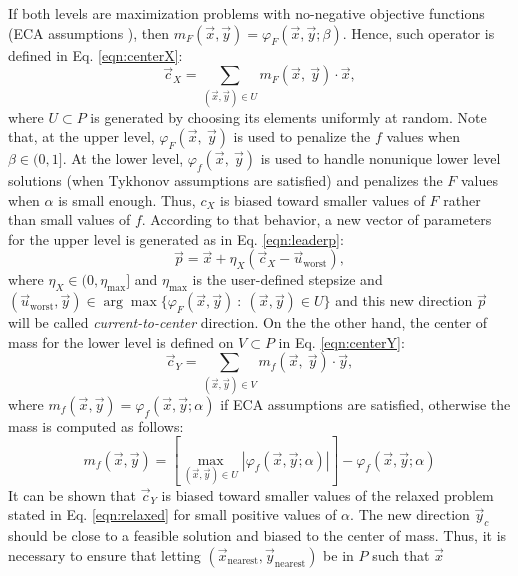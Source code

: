 \documentclass[conference]{IEEEtran}
\theoremstyle{definition}
\begin{document}
If both levels are maximization problems with no-negative objective functions
(ECA assumptions \cite{Mejia2018}), then $m_F(\vec{x}, \vec{y}) = \varphi_F (\vec{x}, \vec{y}; \beta)$.
Hence, such operator is defined in Eq. \ref{eqn:centerX}:
% 
\begin{equation}
    \vec{c}_X = \sum_{(\vec{x}, \vec{y})\in U} m_F(\vec{x},\ \vec{y}) \cdot \vec{x},
    \label{eqn:centerX}
\end{equation}
% 
where $U \subset P$ is generated by choosing its elements uniformly at random.
Note that, at the upper level, $\varphi_F (\vec{x},\ \vec{y})$ is used to penalize
the $f$ values when $\beta\in (0, 1]$. At the lower level, $\varphi_f (\vec{x},\ \vec{y})$
is used to handle nonunique lower level solutions (when Tykhonov assumptions are 
satisfied) and penalizes the $F$ values when $\alpha$ is small enough. Thus, $c_X$
is biased toward smaller values of $F$ rather than small values of $f$. According
to that behavior, a new vector of parameters for the upper level is generated as
in Eq. \ref{eqn:leaderp}:
% 
\begin{equation}
    \vec{p} = \vec{x} + \eta_{X} (\vec{c}_X - \vec{u}_{\text{worst}}),
    \label{eqn:leaderp}
\end{equation}
% 
where $\eta_{X} \in (0, \eta_{\max}]$ and $\eta_{\max}$ is the user-defined stepsize and  
$
    (\vec{u}_{\text{worst}}, \vec{y}) \in \arg \max \{\varphi_F(\vec{x}, \vec{y} )  \ : \ (\vec{x}, \vec{y}) \in U \} 
$ %
% 
and this new direction $\vec{p}$ will be called \textit{current-to-center} direction. %
On the the other hand, the center of mass for the lower level is defined on
$V \subset P$ in Eq. \ref{eqn:centerY}:
% 
\begin{equation}
    \vec{c}_Y = \sum_{(\vec{x}, \vec{y})\in V} m_f(\vec{x},\ \vec{y}) \cdot \vec{y},
    \label{eqn:centerY}
\end{equation}
% 
where $m_f(\vec{x}, \vec{y}) = \varphi_f(\vec{x}, \vec{y}; \alpha )$ if ECA assumptions
are satisfied, otherwise the mass is computed as follows:
% 
\[
    m_f(\vec{x}, \vec{y}) =
        \left[ \max_{(\vec{x}, \vec{y})\in U} |\varphi_f (\vec{x}, \vec{y}; \alpha)| \right]
        - \varphi_f (\vec{x}, \vec{y}; \alpha)
\]
% 
It can be shown that $\vec{c}_Y$ is biased toward smaller values of the relaxed
problem stated in Eq. \ref{eqn:relaxed} for small positive values of $\alpha$.
% 
The new direction $\vec{y}_c$ should be close to a feasible solution and biased
to the center of mass. Thus, it is necessary to ensure that letting
$(\vec{x}_\text{nearest}, \vec{y}_{\text{nearest}}) $ be in $P$ such that $\vec{x}$
\end{document}
